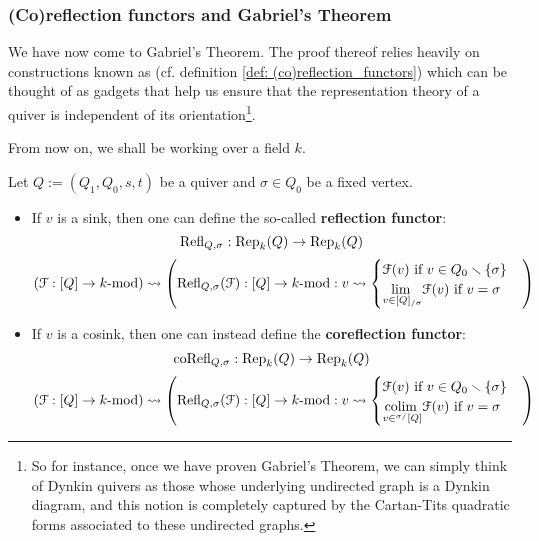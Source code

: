         \subsubsection{(Co)reflection functors and Gabriel's Theorem}
            We have now come to Gabriel's Theorem. The proof thereof relies heavily on constructions known as  (cf. definition \ref{def: (co)reflection_functors}) which can be thought of as gadgets that help us ensure that the representation theory of a quiver is independent of its orientation\footnote{So for instance, once we have proven Gabriel's Theorem, we can simply think of Dynkin quivers as those whose underlying undirected graph is a Dynkin diagram, and this notion is completely captured by the Cartan-Tits quadratic forms associated to these undirected graphs.}. 
            \begin{convention}
                From now on, we shall be working over a field $k$. 
            \end{convention}
            \begin{definition} \label{def: (co)reflection_functors}
                Let $Q := (Q_1, Q_0, s, t)$ be a quiver and $\sigma \in Q_0$ be a fixed vertex. 
                    \begin{itemize}
                        \item If $v$ is a sink, then one can define the so-called \textbf{reflection functor}:
                            $$\mathrm{Refl}_{Q, \sigma}: \mathrm{Rep}_k(Q) \to \mathrm{Rep}_k(Q)$$
                            $$(\mathcal{F}: [Q] \to k\text{-}\mathrm{mod}) \leadsto \left( \mathrm{Refl}_{Q, \sigma}(\mathcal{F}): [Q] \to k\text{-}\mathrm{mod}: v \leadsto \begin{cases} \text{$\mathcal{F}(v)$ if $v \in Q_0 \smallsetminus \{\sigma\}$} \\ \text{$\underset{v \in [Q]_{/\sigma}}{\operatorname{lim} \:} \mathcal{F}(v)$ if $v = \sigma$} \end{cases} \right)$$
                        \item If $v$ is a cosink, then one can instead define the \textbf{coreflection functor}:
                            $$\mathrm{co}\mathrm{Refl}_{Q, \sigma}: \mathrm{Rep}_k(Q) \to \mathrm{Rep}_k(Q)$$
                            $$(\mathcal{F}: [Q] \to k\text{-}\mathrm{mod}) \leadsto \left( \mathrm{Refl}_{Q, \sigma}(\mathcal{F}): [Q] \to k\text{-}\mathrm{mod}: v \leadsto \begin{cases} \text{$\mathcal{F}(v)$ if $v \in Q_0 \smallsetminus \{\sigma\}$} \\ \text{$\underset{v \in {}^{\sigma/}[Q]}{\operatorname{colim} \:} \mathcal{F}(v)$ if $v = \sigma$} \end{cases} \right)$$
                    \end{itemize}
            \end{definition}
